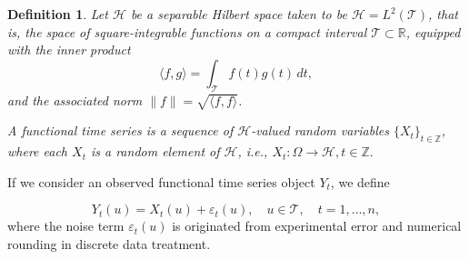 \documentclass[article]{abntex2}
\newtheorem{definition}{Definition} %
\begin{document}
\begin{definition}
Let $\mathcal{H}$ be a separable Hilbert space taken to be $\mathcal{H} = L^2(\mathcal{T})$, that is, the space of square-integrable functions on a compact interval $\mathcal{T} \subset \mathbb{R}$, equipped with the inner product
\begin{equation}
\langle f, g \rangle = \int_{\mathcal{T}} f(t) g(t) \, dt,
\end{equation}
and the associated norm $\|f\| = \sqrt{\langle f, f \rangle}$.

A \emph{functional time series} is a sequence of $\mathcal{H}$-valued random variables $\{X_t\}_{t \in \mathbb{Z}}$, where each $X_t$ is a random element of $\mathcal{H}$, i.e., $X_t : \Omega \to \mathcal{H}, t \in \mathbb{Z}.$

\end{definition}

If we consider an observed functional time series object $Y_t$, we define

\begin{equation}
     Y_t(u) = X_t(u) + \varepsilon_t(u), \quad u \in \mathcal{T}, \quad t = 1, \dots, n,
\end{equation}
where the noise term $\varepsilon_t(u)$ is originated from experimental error and numerical rounding in discrete data treatment.
\end{document}
